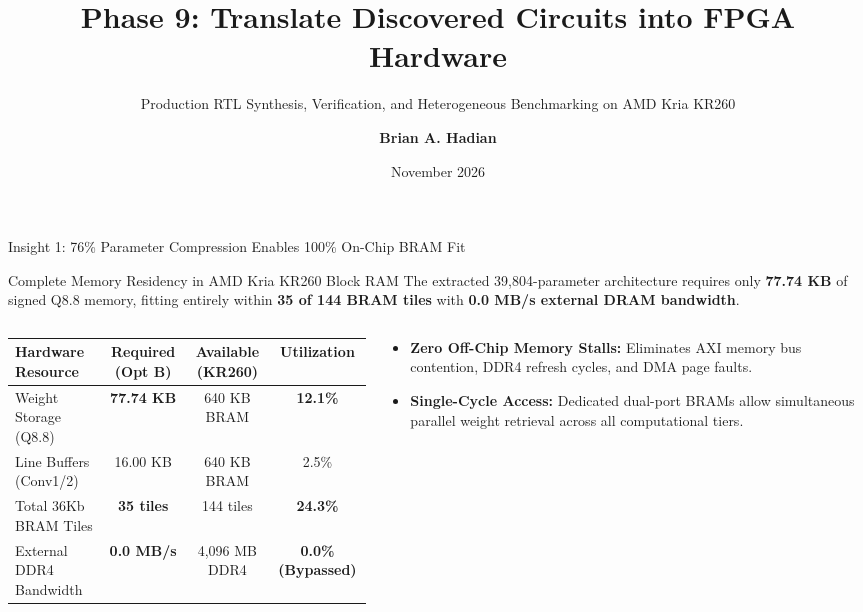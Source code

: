 \documentclass[aspectratio=169, 10pt]{beamer}
\title{Phase 9: Translate Discovered Circuits into FPGA Hardware}
\subtitle{Production RTL Synthesis, Verification, and Heterogeneous Benchmarking on AMD Kria KR260}
\author{\textbf{Brian A. Hadian}}
\institute{Advanced Agentic AI \& Embedded Systems Research \\ Project Hephaestus: Action-Conditioned World Models on FPGA}
\date{November 2026}
\begin{document}
\begin{frame}
  \titlepage
\end{frame}

\begin{frame}{Insight 1: 76\% Parameter Compression Enables 100\% On-Chip BRAM Fit}
  \begin{block}{Complete Memory Residency in AMD Kria KR260 Block RAM}
    The extracted 39,804-parameter architecture requires only \textbf{77.74 KB} of signed Q8.8 memory, fitting entirely within \textbf{35 of 144 BRAM tiles} with \textbf{0.0 MB/s external DRAM bandwidth}.
  \end{block}
  \vspace{-0.2cm}
  \begin{columns}[T]
    \begin{column}{0.54\textwidth}
      \setlength{\tabcolsep}{2pt}
      \begin{table}
        \centering
        \scriptsize
        \begin{tabular}{lccc}
          \toprule
          \textbf{Hardware Resource} & \textbf{Required (Opt B)} & \textbf{Available (KR260)} & \textbf{Utilization} \\
          \midrule
          Weight Storage (Q8.8) & \textbf{77.74 KB} & 640 KB BRAM & \textbf{12.1\%} \\
          Line Buffers (Conv1/2) & 16.00 KB & 640 KB BRAM & 2.5\% \\
          Total 36Kb BRAM Tiles & \textbf{35 tiles} & 144 tiles & \textbf{24.3\%} \\
          External DDR4 Bandwidth & \textbf{0.0 MB/s} & 4,096 MB DDR4 & \textbf{0.0\% (Bypassed)} \\
          \bottomrule
        \end{tabular}
      \end{table}
    \end{column}
    \begin{column}{0.44\textwidth}
      \begin{itemize}
        \item \textbf{Zero Off-Chip Memory Stalls:} Eliminates AXI memory bus contention, DDR4 refresh cycles, and DMA page faults.
        \item \textbf{Single-Cycle Access:} Dedicated dual-port BRAMs allow simultaneous parallel weight retrieval across all computational tiers.
      \end{itemize}
    \end{column}
  \end{columns}
\end{frame}
\end{document}
